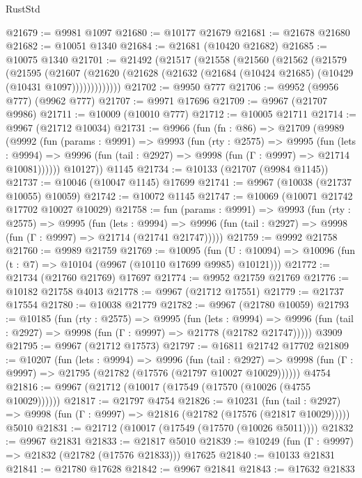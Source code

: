 \begin{lexlean}{RustStd}
\begin{coremodule}
@21679 := @9981 @1097
@21680 := @10177 @21679
@21681 := @21678 @21680
@21682 := @10051 @1340
@21684 := @21681 (@10420 @21682)
@21685 := @10075 @1340
@21701 := @21492
    (@21517
      (@21558
        (@21560
          (@21562
            (@21579
              (@21595
                (@21607
                  (@21620 (@21628 (@21632 (@21684 (@10424 @21685) (@10429 (@10431 @1097)))))))))))))
@21702 := @9950 @777
@21706 := @9952 (@9956 @777) (@9962 @777)
@21707 := @9971 @17696
@21709 := @9967 (@21707 @9986)
@21711 := @10009 (@10010 @777)
@21712 := @10005 @21711
@21714 := @9967 (@21712 @10034)
@21731 := @9966
    (fun (fn : @86) =>
    @21709
      (@9989
        (@9992
          (fun (params : @9991) =>
          @9993
            (fun (rty : @2575) =>
            @9995
              (fun (lets : @9994) =>
              @9996 (fun (tail : @2927) => @9998 (fun (Γ : @9997) => @21714 @10081))))))
        @10127))
    @1145
@21734 := @10133 (@21707 (@9984 @1145))
@21737 := @10046 (@10047 @1145) @17699
@21741 := @9967 (@10038 (@21737 @10055) @10059)
@21742 := @10072 @1145
@21747 := @10069 (@10071 @21742 @17702 @10027 @10029)
@21758 := fun (params : @9991) =>
  @9993
    (fun (rty : @2575) =>
    @9995
      (fun (lets : @9994) =>
      @9996 (fun (tail : @2927) => @9998 (fun (Γ : @9997) => @21714 (@21741 @21747)))))
@21759 := @9992 @21758
@21760 := @9989 @21759
@21769 := @10095
    (fun (U : @10094) => @10096 (fun (t : @7) => @10104 (@9967 (@10110 @17699 @9985) @10121)))
@21772 := @21734 (@21760 @21769) @17697
@21774 := @9952 @21759 @21769
@21776 := @10182 @21758 @4013
@21778 := @9967 (@21712 @17551)
@21779 := @21737 @17554
@21780 := @10038 @21779
@21782 := @9967 (@21780 @10059)
@21793 := @10185
    (fun (rty : @2575) =>
    @9995
      (fun (lets : @9994) =>
      @9996 (fun (tail : @2927) => @9998 (fun (Γ : @9997) => @21778 (@21782 @21747)))))
    @3909
@21795 := @9967 (@21712 @17573)
@21797 := @16811 @21742 @17702
@21809 := @10207
    (fun (lets : @9994) =>
    @9996
      (fun (tail : @2927) =>
      @9998 (fun (Γ : @9997) => @21795 (@21782 (@17576 (@21797 @10027 @10029))))))
    @4754
@21816 := @9967 (@21712 (@10017 (@17549 (@17570 (@10026 (@4755 @10029))))))
@21817 := @21797 @4754
@21826 := @10231
    (fun (tail : @2927) => @9998 (fun (Γ : @9997) => @21816 (@21782 (@17576 (@21817 @10029)))))
    @5010
@21831 := @21712 (@10017 (@17549 (@17570 (@10026 @5011))))
@21832 := @9967 @21831
@21833 := @21817 @5010
@21839 := @10249 (fun (Γ : @9997) => @21832 (@21782 (@17576 @21833))) @17625
@21840 := @10133 @21831
@21841 := @21780 @17628
@21842 := @9967 @21841
@21843 := @17632 @21833

\end{coremodule}
\end{lexlean}
